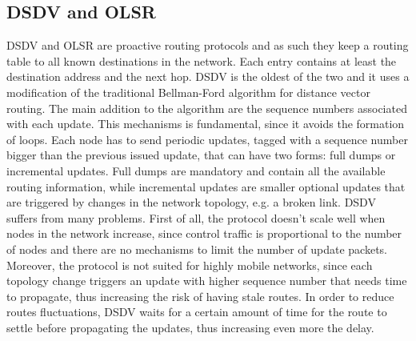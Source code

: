 

\subsection{DSDV and OLSR}

\gls{DSDV} and \gls{OLSR} are proactive routing protocols and as such they keep a routing table to all known destinations in the network. Each entry contains at least the destination address and the next hop. \gls{DSDV} is the oldest of the two and it uses a modification of the traditional Bellman-Ford algorithm for distance vector routing. The main addition to the algorithm are the sequence numbers associated with each update. This mechanisms is fundamental, since it avoids the formation of loops. Each node has to send periodic updates, tagged with a sequence number bigger than the previous issued update, that can have two forms: full dumps or incremental updates. Full dumps are mandatory and contain all the available routing information, while incremental updates are smaller optional updates that are triggered by changes in the network topology, e.g. a broken link. \gls{DSDV} suffers from many problems. First of all, the protocol doesn't scale well when nodes in the network increase, since control traffic is proportional to the number of nodes and there are no mechanisms to limit the number of update packets. Moreover, the protocol is not suited for highly mobile networks, since each topology change triggers an update with higher sequence number that needs time to propagate, thus increasing the risk of having stale routes. In order to reduce routes fluctuations, \gls{DSDV} waits for a certain amount of time for the route to settle before propagating the updates, thus increasing even more the delay. \\ \\
